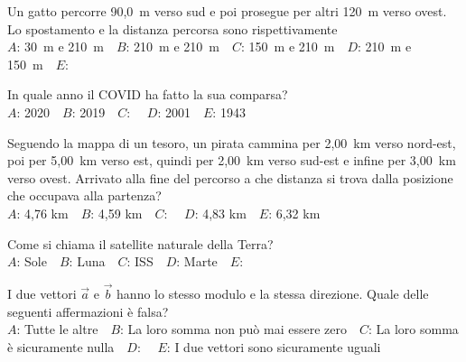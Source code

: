 \mcquestionfooter



\def\mcquestionnumber{2}


\mcquestionheader Un gatto percorre 90,0~m verso sud e poi prosegue per altri 120~m verso ovest. Lo spostamento e la distanza percorsa sono rispettivamente\\
{$A$}: 30~m e 210~m\ \ {$B$}: 210~m e 210~m\ \ {$C$}: 150~m e 210~m\ \ {$D$}: 210~m e 150~m\ \ {$E$}: \ \ 

\mcquestionfooter



\def\mcquestionnumber{3}


\mcquestionheader In quale anno il COVID ha fatto la sua comparsa?\\
{$A$}: 2020\ \ {$B$}: 2019\ \ {$C$}: \ \ {$D$}: 2001\ \ {$E$}: 1943\ \ 

\mcquestionfooter



\def\mcquestionnumber{4}


\mcquestionheader Seguendo la mappa di un tesoro, un pirata cammina per 2,00~km verso nord-est, poi per 5,00~km verso est, quindi per 2,00~km verso sud-est e infine per 3,00~km verso ovest. Arrivato alla fine del percorso a che distanza si trova dalla posizione che occupava alla partenza?\\
{$A$}: 4,76 km\ \ {$B$}: 4,59 km\ \ {$C$}: \ \ {$D$}: 4,83 km\ \ {$E$}: 6,32 km\ \ 

\mcquestionfooter



\def\mcquestionnumber{5}


\mcquestionheader Come si chiama il satellite naturale della Terra?\\
{$A$}: Sole\ \ {$B$}: Luna\ \ {$C$}: ISS\ \ {$D$}: Marte\ \ {$E$}: \ \ 

\mcquestionfooter



\def\mcquestionnumber{6}


\mcquestionheader I due vettori $\vec{a}$ e $\vec{b}$ hanno lo stesso modulo e la stessa direzione. Quale delle seguenti affermazioni è falsa?\\
{$A$}: Tutte le altre\ \ {$B$}: La loro somma non può mai essere zero\ \ {$C$}: La loro somma è sicuramente nulla\ \ {$D$}: \ \ {$E$}: I due vettori sono sicuramente uguali\ \ 

\mcquestionfooter



\def\mcquestionnumber{7}


